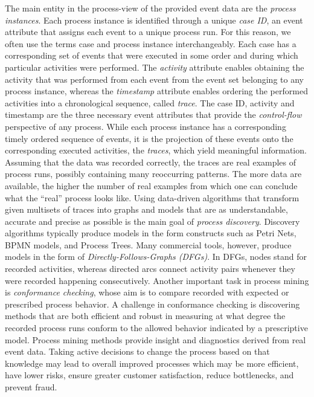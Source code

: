 The main entity in the process-view of the provided event data are the \textit{process instances}.
Each process instance is identified through a unique \textit{case ID}, an event attribute that assigns each event to a unique process run.
For this reason, we often use the terms case and process instance interchangeably.
Each case has a corresponding set of events that were executed in some order and during which particular activities were performed.
The \textit{activity} attribute enables obtaining the activity that was performed from each event from the event set belonging to any process instance, whereas the \textit{timestamp} attribute enables ordering the performed activities into a chronological sequence, called \textit{trace}.
The case ID, activity and timestamp are the three necessary event attributes that provide the \textit{control-flow} perspective of any process.
While each process instance has a corresponding timely ordered sequence of events, it is the projection of these events onto the corresponding executed activities, the \textit{traces}, which yield meaningful information.
Assuming that the data was recorded correctly, the traces are real examples of process runs, possibly containing many reoccurring patterns.
The more data are available, the higher the number of real examples from which one can conclude what the ``real'' process looks like.
Using data-driven algorithms that transform given multisets of traces into graphs and models that are as understandable, accurate and precise as possible is the main goal of \textit{process discovery}.
Discovery algorithms typically produce models in the form constructs such as Petri Nets, BPMN models, and Process Trees.
Many commercial tools, however, produce models in the form of  \textit{Directly-Follows-Graphs (DFGs)}.
In DFGs, nodes stand for recorded activities, whereas directed arcs connect activity pairs whenever they were recorded happening consecutively.
Another important task in process mining is \textit{conformance checking}, whose aim is to compare recorded with expected or prescribed process behavior.
A challenge in conformance checking is discovering methods that are both efficient and robust in measuring at what degree the recorded process runs conform to the allowed behavior indicated by a prescriptive model.
Process mining methods provide insight and diagnostics derived from real event data.
Taking active decisions to change the process based on that knowledge may lead to overall improved processes which may be more efficient, have lower risks, ensure greater customer satisfaction, reduce bottlenecks, and prevent fraud.\\
